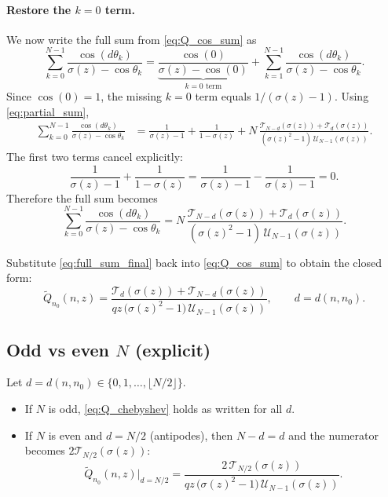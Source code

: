 \documentclass[11pt]{article}
\newcommand{\T}{\mathcal{T}}
\newcommand{\U}{\mathcal{U}}
\begin{document}
\paragraph{Restore the $k=0$ term.}
We now write the full sum from \eqref{eq:Q_cos_sum} as
\[
\sum_{k=0}^{N-1}\frac{\cos(d\theta_k)}{\sigma(z)-\cos\theta_k}
=
\underbrace{\frac{\cos(0)}{\sigma(z)-\cos(0)}}_{\text{$k=0$ term}}
+
\sum_{k=1}^{N-1}\frac{\cos(d\theta_k)}{\sigma(z)-\cos\theta_k}.
\]
Since $\cos(0)=1$, the missing $k=0$ term equals $1/(\sigma(z)-1)$. Using \eqref{eq:partial_sum},
\begin{align}
\sum_{k=0}^{N-1}\frac{\cos(d\theta_k)}{\sigma(z)-\cos\theta_k}
&=
\frac{1}{\sigma(z)-1}
+
\frac{1}{1-\sigma(z)}
+
N\,\frac{\T_{N-d}(\sigma(z))+\T_{d}(\sigma(z))}{(\sigma(z)^2-1)\,\U_{N-1}(\sigma(z))}.
\label{eq:full_sum_with_cancel}
\end{align}
The first two terms cancel explicitly:
\[
\frac{1}{\sigma(z)-1}+\frac{1}{1-\sigma(z)}
=
\frac{1}{\sigma(z)-1}-\frac{1}{\sigma(z)-1}=0.
\]
Therefore the full sum becomes
\begin{equation}
\sum_{k=0}^{N-1}\frac{\cos(d\theta_k)}{\sigma(z)-\cos\theta_k}
=
N\,\frac{\T_{N-d}(\sigma(z))+\T_{d}(\sigma(z))}{(\sigma(z)^2-1)\,\U_{N-1}(\sigma(z))}.
\label{eq:full_sum_final}
\end{equation}

Substitute \eqref{eq:full_sum_final} back into \eqref{eq:Q_cos_sum} to obtain the closed form:
\begin{equation}
\boxed{
\tilde Q_{n_0}(n,z)=
\frac{\T_{d}(\sigma(z))+\T_{N-d}(\sigma(z))}
{qz\,\bigl(\sigma(z)^2-1\bigr)\,\U_{N-1}(\sigma(z))},
\qquad d=d(n,n_0).
}
\label{eq:Q_chebyshev}
\end{equation}

\subsection{Odd vs even $N$ (explicit)}
Let $d=d(n,n_0)\in\{0,1,\dots,\lfloor N/2\rfloor\}$.
\begin{itemize}
\item If $N$ is odd, \eqref{eq:Q_chebyshev} holds as written for all $d$.
\item If $N$ is even and $d=N/2$ (antipodes), then $N-d=d$ and the numerator becomes $2\T_{N/2}(\sigma(z))$:
\[
\tilde Q_{n_0}(n,z)\big|_{d=N/2}
=
\frac{2\,\T_{N/2}(\sigma(z))}
{qz\,\bigl(\sigma(z)^2-1\bigr)\,\U_{N-1}(\sigma(z))}.
\]
\end{itemize}
\end{document}
